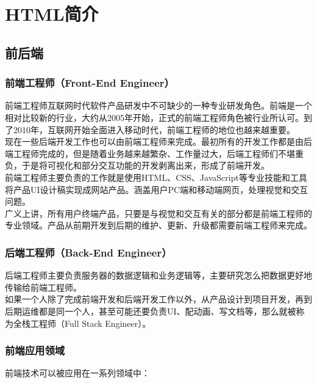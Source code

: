 \chapter{HTML简介}

\section{前后端}

\subsection{前端工程师（Front-End Engineer）}

前端工程师互联网时代软件产品研发中不可缺少的一种专业研发角色。前端是一个相对比较新的行业，大约从2005年开始，正式的前端工程师角色被行业所认可。到了2010年，互联网开始全面进入移动时代，前端工程师的地位也越来越重要。 \\

现在一些后端开发工作也可以由前端工程师来完成。最初所有的开发工作都是由后端工程师完成的，但是随着业务越来越繁杂、工作量过大，后端工程师们不堪重负，于是将可视化和部分交互功能的开发剥离出来，形成了前端开发。 \\

前端工程师主要负责的工作就是使用HTML、CSS、JavaScript等专业技能和工具将产品UI设计稿实现成网站产品。涵盖用户PC端和移动端网页，处理视觉和交互问题。 \\

广义上讲，所有用户终端产品，只要是与视觉和交互有关的部分都是前端工程师的专业领域。产品从前期开发到后期的维护、更新、升级都需要前端工程师来完成。

\subsection{后端工程师（Back-End Engineer）}

后端工程师主要负责服务器的数据逻辑和业务逻辑等，主要研究怎么把数据更好地传输给前端工程师。 \\

如果一个人除了完成前端开发和后端开发工作以外，从产品设计到项目开发，再到后期运维都是同一个人，甚至可能还要负责UI、配动画、写文档等，那么就被称为全栈工程师（Full Stack Engineer）。

\subsection{前端应用领域}

前端技术可以被应用在一系列领域中：

